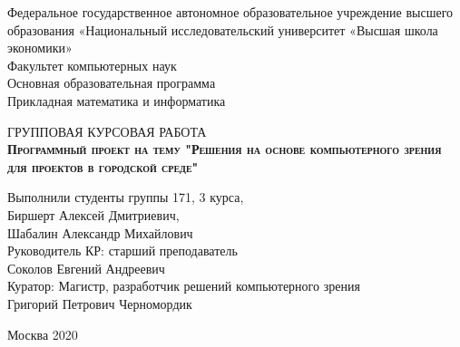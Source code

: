 \begin{titlepage}
    \newpage

    {
    \begin{center}
        Федеральное государственное автономное образовательное учреждение высшего образования «Национальный исследовательский университет «Высшая школа экономики»
        \\
        \bigskip
        Факультет компьютерных наук \\
        Основная образовательная программа \\
        Прикладная математика и информатика \\
    \end{center}
    }

    \vspace{8em}

    \begin{center}
    {\Large ГРУППОВАЯ КУРСОВАЯ РАБОТА}
        \\
        \textsc{\textbf{
        Программный проект на тему
        \linebreak
        "Решения на основе компьютерного зрения для проектов в городской среде"}}
    \end{center}

    \vspace{2em}

    {
    \hfill\parbox{16cm}{
    \hspace*{5cm}\hspace*{-5cm}Выполнили студенты группы 171, 3 курса,\\
    Биршерт Алексей Дмитриевич,\\
    Шабалин Александр Михайлович\\

    \hspace*{5cm}\hspace*{-5cm}Руководитель КР: старший преподаватель\\ Соколов Евгений Андреевич
    \\


    \hspace*{5cm}\hspace*{-5cm}Куратор: Магистр, разработчик решений компьютерного зрения \\
    Григорий Петрович Черномордик
    \\
    }
    }

    \vspace{\fill}

    \begin{center}
        Москва 2020
    \end{center}

\end{titlepage}